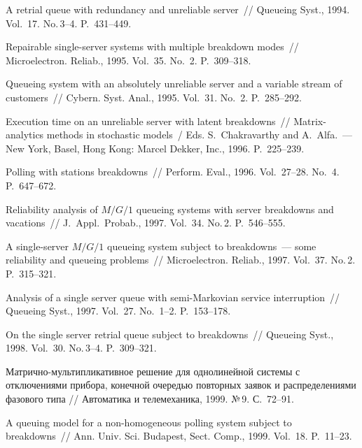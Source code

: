 \begin{multicols}{2}
{{\begin{thebibliography}{99}
A retrial queue with redundancy and unreliable server~// Queueing Syst., 1994. Vol.~17. No.\,3--4. P.~431--449.

Repairable single-server systems with multiple breakdown modes~//
Microelectron. Reliab., 1995. Vol.~35. No.~2. P.~309--318.

Queueing system with an absolutely unreliable server and a variable stream of customers~//
Cybern. Syst. Anal., 1995. Vol.~31. No.~2. P.~285--292.

Execution time on an unreliable server with latent breakdowns~//
Matrix-analytics methods in stochastic models~/
Eds. S.~Chakravarthy and A.~Alfa.~--- New York, Basel, Hong Kong: Marcel Dekker, Inc., 1996. P.~225--239.

Polling with stations breakdowns~// Perform. Eval., 1996.
Vol.~27--28. No.~4. P.~647--672.

Reliability analysis of $M/G/1$ queueing systems with server breakdowns and vacations~//
J.\ Appl.\ Probab., 1997. Vol.~34. No.\,2. P.~546--555.

A single-server $M/G/1$ queueing system subject to breakdowns~--- some reliability and queueing problems~//
Microelectron. Reliab., 1997. Vol.~37. No.\,2. P.~315--321.

Analysis of a single server queue with semi-Markovian service interruption~//
Queueing Syst., 1997. Vol.~27. No.~1--2. P.~153--178.

On the single server retrial queue subject to breakdowns~//
Queueing Syst., 1998. Vol.~30. No.\,3--4. P.~309--321.

Матрично-мультипликативное решение для однолинейной системы с
отключениями прибора, конечной очередью повторных заявок и распределениями фазового типа //
Автоматика и телемеханика, 1999. №\,9. С.~72--91.

A queuing model for a non-homogeneous polling system subject to breakdowns~//
Ann. Univ. Sci. Budapest, Sect. Comp., 1999. Vol.~18. P.~11--23.


\end{thebibliography}}}
\end{multicols}
